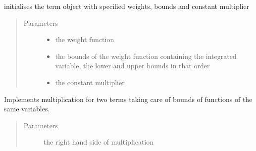 \documentclass[letterpaper,10pt,english,openany,oneside]{sphinxmanual}
\begin{document}
\begin{fulllineitems}
\begin{fulllineitems}
\end{fulllineitems}


\begin{fulllineitems}
\label{\detokenize{index:term.Term.__init__}}
initialises the term object with specified weights, bounds and constant multiplier
\begin{quote}\begin{description}
\item[{Parameters}] \leavevmode\begin{itemize}
\item {} 
 \textendash{} the weight function

\item {} 
 \textendash{} the bounds of the weight function containing the integrated variable, the lower and upper bounds in that order

\item {} 
 \textendash{} the constant multiplier

\end{itemize}

\end{description}\end{quote}

\end{fulllineitems}


\begin{fulllineitems}
\label{\detokenize{index:term.Term.__mul__}}
Implements multiplication for two terms taking care of bounds of functions of the same variables.
\begin{quote}\begin{description}
\item[{Parameters}] \leavevmode
{} \textendash{} the right hand side {\hyperref[\detokenize{index:term.Term}]{}} of multiplication


\end{description}
\end{quote}
\end{fulllineitems}
\end{fulllineitems}
\end{document}
